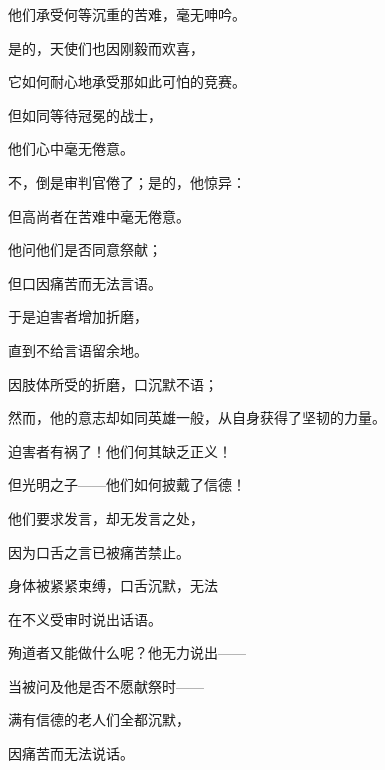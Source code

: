 他们承受何等沉重的苦难，毫无呻吟。\par

是的，天使们也因刚毅而欢喜，\par

它如何耐心地承受那如此可怕的竞赛。\par

但如同等待冠冕的战士，\par

他们心中毫无倦意。\par

不，倒是审判官倦了；是的，他惊异：\par

但高尚者在苦难中毫无倦意。\par

他问他们是否同意祭献；\par

但口因痛苦而无法言语。\par

于是迫害者增加折磨，\par

直到不给言语留余地。\par

因肢体所受的折磨，口沉默不语；\par

然而，他的意志却如同英雄一般，从自身获得了坚韧的力量。\par

迫害者有祸了！他们何其缺乏正义！\par

但光明之子——他们如何披戴了信德！\par

他们要求发言，却无发言之处，\par

因为口舌之言已被痛苦禁止。\par

身体被紧紧束缚，口舌沉默，无法\par

在不义受审时说出话语。\par

殉道者又能做什么呢？他无力说出——\par

当被问及他是否不愿献祭时——\par

满有信德的老人们全都沉默，\par

因痛苦而无法说话。\par

